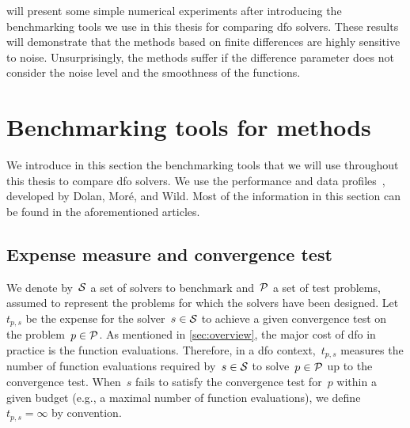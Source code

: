  will present some simple numerical experiments after introducing the benchmarking tools we use in this thesis for comparing \gls{dfo} solvers.
These results will demonstrate that the methods based on finite differences are highly sensitive to noise.
Unsurprisingly, the methods suffer if the difference parameter does not consider the noise level and the smoothness of the functions.

\section{Benchmarking tools for  methods}
\label{sec:benchmarking-tools}

We introduce in this section the benchmarking tools that we will use throughout this thesis to compare \gls{dfo} solvers.
We use the performance and data profiles~\cite{Dolan_More_2002,More_Wild_2009}, developed by Dolan, Mor{\'{e}}, and Wild.
Most of the information in this section can be found in the aforementioned articles.

\subsection{Expense measure and convergence test}
\label{subsec:convergence-test}

We denote by~$\mathcal{S}$ a set of solvers to benchmark and~$\mathcal{P}$ a set of test problems, assumed to represent the problems for which the solvers have been designed.
Let~$t_{p, s}$ be the expense for the solver~$s \in \mathcal{S}$ to achieve a given convergence test on the problem~$p \in \mathcal{P}$.
As mentioned in \cref{sec:overview}, the major cost of \gls{dfo} in practice is the function evaluations.
Therefore, in a \gls{dfo} context,~$t_{p, s}$ measures the number of function evaluations required by~$s \in \mathcal{S}$ to solve~$p \in \mathcal{P}$ up to the convergence test.
When~$s$ fails to satisfy the convergence test for~$p$ within a given budget (e.g., a maximal number of function evaluations), we define~$t_{p, s} = \infty$ by convention.

